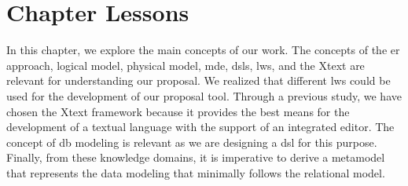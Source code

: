\section{Chapter Lessons}
\label{sec_back:lessons}

In this chapter, we explore the main concepts of our work. 
The concepts of the \ac{er} approach, logical model, physical model, \ac{mde}, \acp{dsl}, \acp{lw}, and the Xtext are relevant for understanding our proposal.
We realized that different \acp{lw} could be used for the development of our proposal tool.
Through a previous study, we have chosen the Xtext framework because it provides the best means for the development of a textual language with the support of an integrated editor.
The concept of \ac{db} modeling is relevant as we are designing a \ac{dsl} for this purpose.
Finally, from these knowledge domains, it is imperative to derive a metamodel that represents the data modeling that minimally follows the relational model.